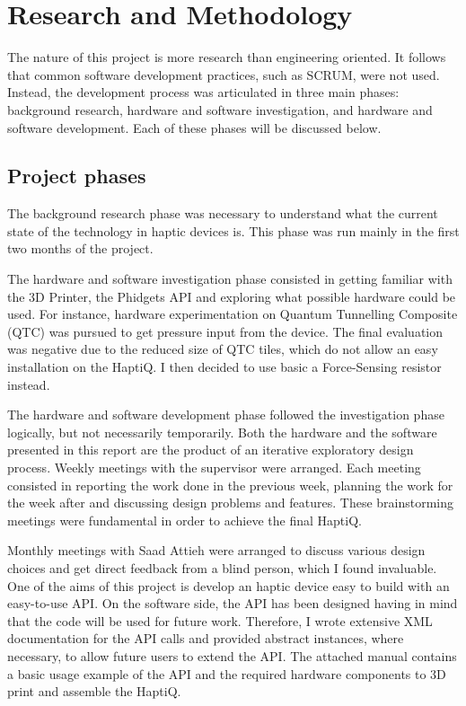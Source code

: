 \chapter{Research and Methodology}

The nature of this project is more research than engineering oriented. It follows that common software development practices, such as SCRUM, were not used. Instead, the development process was articulated in three main phases: background research, hardware and software investigation, and hardware and software development. Each of these phases will be discussed below. 

\section{Project phases}
The background research phase was necessary to understand what the current state of the technology in haptic devices is. This phase was run mainly in the first two months of the project. 

The hardware and software investigation phase consisted in getting familiar with the 3D Printer, the Phidgets API and exploring what possible hardware could be used. For instance, hardware experimentation on Quantum Tunnelling Composite (QTC) was pursued to get pressure input from the device. The final evaluation was negative due to the reduced size of QTC tiles, which do not allow an easy installation on the HaptiQ. I then decided to use basic a Force-Sensing resistor instead. 

The hardware and software development phase followed the investigation phase logically, but not necessarily temporarily. Both the hardware and the software presented in this report are the product of an iterative exploratory design process. Weekly meetings with the supervisor were arranged. Each meeting consisted in reporting the work done in the previous week, planning the work for the week after and discussing design problems and features. These brainstorming meetings were fundamental in order to achieve the final HaptiQ.

Monthly meetings with Saad Attieh were arranged to discuss various design choices and get direct feedback from a blind person, which I found invaluable. 
One of the aims of this project is develop an haptic device easy to build with an easy-to-use API. On the software side, the API has been designed having in mind that the code will be used for future work. Therefore, I wrote extensive XML documentation for the API calls and provided abstract instances, where necessary, to allow future users to extend the API. The attached manual contains a basic usage example of the API and the required hardware components to 3D print and assemble the HaptiQ. 

